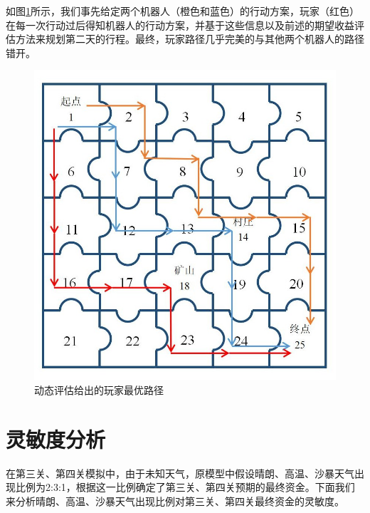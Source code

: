 \documentclass[withoutpre]{cumcmthesis} %
\begin{document}
如图\ref{fig:map6path}所示，我们事先给定两个机器人（橙色和蓝色）的行动方案，玩家（红色）在每一次行动过后得知机器人的行动方案，并基于这些信息以及前述的期望收益评估方法来规划第二天的行程。最终，玩家路径几乎完美的与其他两个机器人的路径错开。
\begin{figure}[H]
	\centering
	\includegraphics[scale=0.4]{figures/map6path}
	\caption{动态评估给出的玩家最优路径}
	\label{fig:map6path}
\end{figure}
\section{灵敏度分析}
在第三关、第四关模拟中，由于未知天气，原模型中假设晴朗、高温、沙暴天气出现比例为2:3:1，根据这一比例确定了第三关、第四关预期的最终资金。下面我们来分析晴朗、高温、沙暴天气出现比例对第三关、第四关最终资金的灵敏度。
\end{document}
